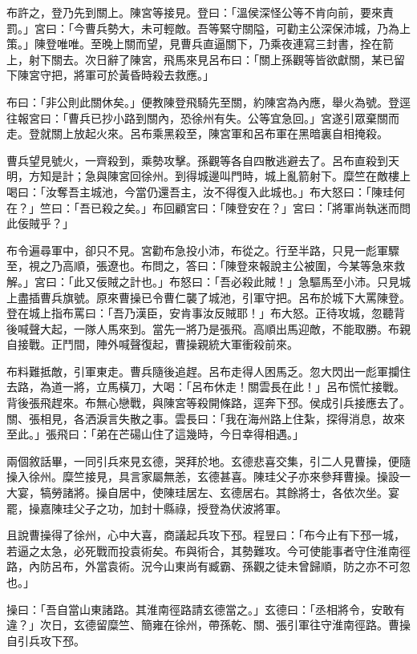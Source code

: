 布許之，登乃先到關上。陳宮等接見。登曰：「溫侯深怪公等不肯向前，要來責罰。」宮曰：「今曹兵勢大，未可輕敵。吾等緊守關隘，可勸主公深保沛城，乃為上策。」陳登唯唯。至晚上關而望，見曹兵直逼關下，乃乘夜連寫三封書，拴在箭上，射下關去。次日辭了陳宮，飛馬來見呂布曰：「關上孫觀等皆欲獻關，某已留下陳宮守把，將軍可於黃昏時殺去救應。」

布曰：「非公則此關休矣。」便教陳登飛騎先至關，約陳宮為內應，舉火為號。登逕往報宮曰：「曹兵已抄小路到關內，恐徐州有失。公等宜急回。」宮遂引眾棄關而走。登就關上放起火來。呂布乘黑殺至，陳宮軍和呂布軍在黑暗裏自相掩殺。

曹兵望見號火，一齊殺到，乘勢攻擊。孫觀等各自四散逃避去了。呂布直殺到天明，方知是計；急與陳宮回徐州。到得城邊叫門時，城上亂箭射下。糜竺在敵樓上喝曰：「汝奪吾主城池，今當仍還吾主，汝不得復入此城也。」布大怒曰：「陳珪何在？」竺曰：「吾已殺之矣。」布回顧宮曰：「陳登安在？」宮曰：「將軍尚執迷而問此佞賊乎？」

布令遍尋軍中，卻只不見。宮勸布急投小沛，布從之。行至半路，只見一彪軍驟至，視之乃高順，張遼也。布問之，答曰：「陳登來報說主公被圍，今某等急來救解。」宮曰：「此又佞賊之計也。」布怒曰：「吾必殺此賊！」急驅馬至小沛。只見城上盡插曹兵旗號。原來曹操已令曹仁襲了城池，引軍守把。呂布於城下大罵陳登。登在城上指布罵曰：「吾乃漢臣，安肯事汝反賊耶！」布大怒。正待攻城，忽聽背後喊聲大起，一隊人馬來到。當先一將乃是張飛。高順出馬迎敵，不能取勝。布親自接戰。正鬥間，陣外喊聲復起，曹操親統大軍衝殺前來。

布料難抵敵，引軍東走。曹兵隨後追趕。呂布走得人困馬乏。忽大閃出一彪軍攔住去路，為道一將，立馬橫刀，大喝：「呂布休走！關雲長在此！」呂布慌忙接戰。背後張飛趕來。布無心戀戰，與陳宮等殺開條路，逕奔下邳。侯成引兵接應去了。關、張相見，各洒淚言失散之事。雲長曰：「我在海州路上住紮，探得消息，故來至此。」張飛曰：「弟在芒碭山住了這幾時，今日幸得相遇。」

兩個敘話畢，一同引兵來見玄德，哭拜於地。玄德悲喜交集，引二人見曹操，便隨操入徐州。糜竺接見，具言家屬無恙，玄德甚喜。陳珪父子亦來參拜曹操。操設一大宴，犒勞諸將。操自居中，使陳珪居左、玄德居右。其餘將士，各依次坐。宴罷，操嘉陳珪父子之功，加封十縣祿，授登為伏波將軍。

且說曹操得了徐州，心中大喜，商議起兵攻下邳。程昱曰：「布今止有下邳一城，若逼之太急，必死戰而投袁術矣。布與術合，其勢難攻。今可使能事者守住淮南徑路，內防呂布，外當袁術。況今山東尚有臧霸、孫觀之徒未曾歸順，防之亦不可忽也。」

操曰：「吾自當山東諸路。其淮南徑路請玄德當之。」玄德曰：「丞相將令，安敢有違？」次日，玄德留糜竺、簡雍在徐州，帶孫乾、關、張引軍往守淮南徑路。曹操自引兵攻下邳。

